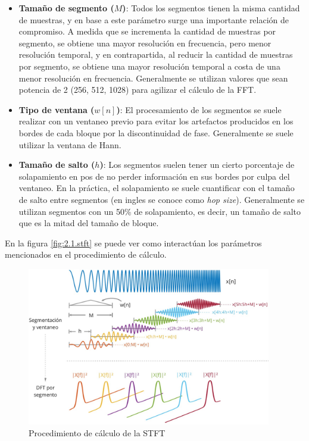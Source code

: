 \begin{itemize}
    \item \textbf{Tamaño de segmento ($M$)}: Todos los segmentos tienen la misma cantidad de muestras, y en base a este parámetro surge una importante relación de compromiso. A medida que se incrementa la cantidad de muestras por segmento, se obtiene una mayor resolución en frecuencia, pero menor resolución temporal, y en contrapartida, al reducir la cantidad de muestras por segmento, se obtiene una mayor resolución temporal a costa de una menor resolución en frecuencia. Generalmente se utilizan valores que sean potencia de 2 (256, 512, 1028) para agilizar el cálculo de la FFT.
    \item \textbf{Tipo de ventana ($w[n]$)}: El procesamiento de los segmentos se suele realizar con un ventaneo previo para evitar los artefactos producidos en los bordes de cada bloque por la discontinuidad de fase. Generalmente se suele utilizar la ventana de Hann.
    \item \textbf{Tamaño de salto ($h$)}: Los segmentos suelen tener un cierto porcentaje de solapamiento en pos de no perder información en sus bordes por culpa del ventaneo. En la práctica, el solapamiento se suele cuantificar con el tamaño de salto entre segmentos (en ingles se conoce como \textit{hop size}). Generalmente se utilizan segmentos con un 50\% de solapamiento, es decir, un tamaño de salto que es la mitad del tamaño de bloque.
\end{itemize}

En la figura \eqref{fig:2.1.stft} se puede ver como interactúan los parámetros mencionados en el procedimiento de cálculo.

\begin{figure}[h]
    \centering
    \includegraphics[width=0.95\textwidth]{figures/2.1.stft.jpg}
    \caption{Procedimiento de cálculo de la STFT}
    \label{fig:2.1.stft}
\end{figure}


